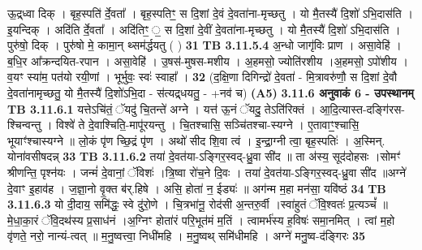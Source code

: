 \documentclass[17pt]{extarticle}
\begin{document}
{{{{{{{{{{{{{{{{{{{{{{                  ऊ॒द्र्ध्वा दिक् । बृह॒स्पति॑ र्दे॒वता᳚ । बृह॒स्पतिꣳ॒॒ स दि॒शां दे॒वं दे॒वता॑ना-मृच्छतु । यो मै॒तस्यै॑ दि॒शो॑ ऽभि॒दास॑ति । इ॒यन्दिक् । अदि॑ति र्दे॒वता᳚ । अदि॑तिꣳ॒ ॒ स दि॒शां दे॒वीं दे॒वता॑ना-मृच्छतु । यो मै॒तस्यै॑ दि॒शो॑ ऽभि॒दास॑ति । पुरु॑षो॒ दिक् । पुरु॑षो मे॒ कामा॒न् थ्सम॑र्द्धयतु ( ) \textbf{ 31} \newline
                  \newline
                                \textbf{ TB 3.11.5.4} \newline
                  अ॒न्धो जागृ॑विः प्राण । असा॒वेहि॑ । ब॒धि॒र आ᳚क्रन्दयित-रपान । असा॒वेहि॑ । उ॒षस॑-मुषस-मशीय । अ॒हमसो॒ ज्योति॑रशीय ।अ॒हमसो॒ ऽपो॑शीय । व॒यꣳ स्या॑म॒ पत॑यो रयी॒णां । भूर्भुवः॒ स्वः॑ स्वाहा᳚ । \textbf{ 32} \newline
                  \newline
                                    (द॒क्षि॒णा दिगिन्द्रो॑ दे॒वता॑ - मि॒त्रावरु॑णौ॒ स दि॒शां दे॒वौ दे॒वता॑नामृच्छतु॒ 
यो मै॒तस्यै॑ दि॒शो॑ऽभि॒दा - स॑त्यद्र्धयतु॒ - +नव॑ च) \textbf{(A5)} \newline \newline
                \textbf{ 3.11.6    अनुवाकं   6 - उपस्थानम्} \newline
                                \textbf{ TB 3.11.6.1} \newline
                  यत्तेऽचि॑तं॒ ॅयदु॑ चि॒तन्ते॑ अग्ने । यत्त॑ ऊ॒नं ॅयदु॒ तेऽति॑रिक्तं । आ॒दि॒त्यास्त-दङ्गि॑रस-श्चिन्वन्तु । विश्वे॑ ते दे॒वाश्चिति॒-मापू॑रयन्तु । चि॒तश्चासि॒ सञ्चि॑तश्चा-स्यग्ने । ए॒तावाꣳ॒॒श्चासि॒ भूयाꣳ॑श्चास्यग्ने ॥ लो॒कं पृ॑ण च्छि॒द्रं पृ॑ण । अथो॑ सीद शि॒वा त्वं । इ॒न्द्रा॒ग्नी त्वा॒ बृह॒स्पतिः॑ । अ॒स्मिन्. योना॑वसीषदन्न् \textbf{ 33} \newline
                  \newline
                                \textbf{ TB 3.11.6.2} \newline
                  तया॑ दे॒वत॑या-ऽङ्गिर॒स्वद्-ध्रु॒वा सी॑द ॥ ता अ॑स्य॒ सूद॑दोहसः ।सोमꣳ॑ श्रीणन्ति॒ पृश्न॑यः । जन्मं॑ दे॒वानां॒ ॅविशः॑ ।त्रि॒ष्वा रो॑च॒ने दि॒वः । तया॑ दे॒वत॑या-ऽङ्गिर॒स्वद्-ध्रु॒वा सी॑द ॥अग्ने॑ दे॒वाꣳ इ॒हाव॑ह । ज॒ज्ञा॒नो वृ॒क्त ब॑र्.हिषे । असि॒ होता॑ न॒ ईड्यः॑ ॥ अग॑न्म म॒हा मन॑सा॒ यवि॑ष्ठं \textbf{ 34} \newline
                  \newline
                                \textbf{ TB 3.11.6.3} \newline
                  यो दी॒दाय॒ समि॑द्धः॒ स्वे दु॑रो॒णे । चि॒त्रभा॑नू॒ रोद॑सी अ॒न्तरु॒र्वी ।स्वा॑हुतं ॅवि॒श्वतः॑ प्र॒त्यञ्चं᳚ ॥ मे॒धा॒का॒रं ॅवि॒दथ॑स्य प्र॒साध॑नं ।अ॒ग्निꣳ होता॑रं परि॒भूत॑मं म॒तिं । त्वामर्भ॑स्य ह॒विषः॑ समा॒नमित् । त्वां म॒हो वृ॑णते॒ नरो॒ नान्यं-त्वत् ॥ म॒नु॒ष्वत्त्वा॒ निधी॑महि । म॒नु॒ष्वथ् समि॑धीमहि । अग्ने॑ मनु॒ष्व-द॑ङ्गिरः \textbf{ 35} \newline
}}}}}}}}}}}}}}}}}}}}}}
\end{document}
